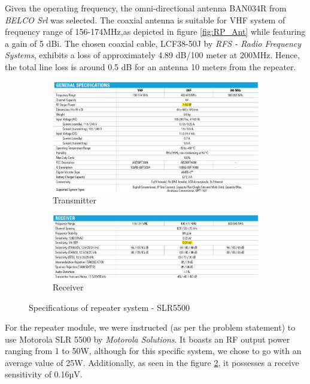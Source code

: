 Given the operating frequency, the omni-directional antenna BAN034R from \textit{BELCO Srl} was selected.
The coaxial antenna is suitable for VHF system of frequency range of 156-174MHz,as depicted in figure \ref{fig:RP_Ant} while featuring a gain of 5 dBi\cite{BAN034R}.
The chosen coaxial cable, LCF38-50J by \textit{RFS - Radio Frequency Systems}, exhibits a loss of approximately 4.89 dB/100 meter at 200MHz.
Hence, the total line loss is around 0.5 dB for an antenna 10 meters from the repeater.

\begin{figure}[H]
\centering
     \begin{subfigure}[b]{0.45\textwidth}
         \centering
         \includegraphics[width=\textwidth]{Images/SLR5500 TX.jpg}
         \caption{\small Transmitter}
         \label{fig:SLRTx}
     \end{subfigure}
     \hspace{1cm}
     \begin{subfigure}[b]{0.45\textwidth}
         \centering
         \includegraphics[width=\textwidth]{Images/SLR5500 RX.jpg}
         \caption{\small Receiver}
         \label{fig:SLRRx}
     \end{subfigure}
     \caption{Specifications of repeater system - SLR5500}
        \label{fig:SLR5500}
\end{figure}

For the repeater module, we were instructed (as per the problem statement) to use Motorola SLR 5500 by \textit{Motorola Solutions}.
It boasts an RF output power ranging from 1 to 50W, although for this specific system, we chose to go with an average value of 25W.
Additionally, as seen in the figure \ref{fig:SLRRx}, it possesses a receive sensitivity of 0.16µV.


